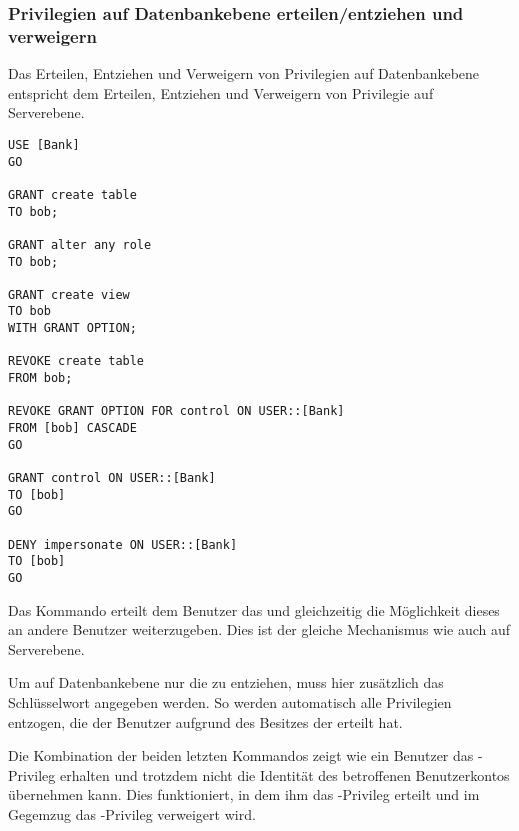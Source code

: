         \subsubsection{Privilegien auf Datenbankebene erteilen/entziehen
        und verweigern}
          Das Erteilen, Entziehen und Verweigern von Privilegien auf
          Datenbankebene entspricht dem Erteilen, Entziehen und Verweigern von
          Privilegie auf Serverebene.
          
          \begin{lstlisting}[language=ms_sql, caption={Privilegien auf
          Datenbankebene erteilen, entziehen und verweigern},label=admin19_17]
USE [Bank]
GO

GRANT create table 
TO bob;

GRANT alter any role 
TO bob;

GRANT create view 
TO bob
WITH GRANT OPTION;

REVOKE create table 
FROM bob;

REVOKE GRANT OPTION FOR control ON USER::[Bank] 
FROM [bob] CASCADE
GO

GRANT control ON USER::[Bank] 
TO [bob]
GO

DENY impersonate ON USER::[Bank] 
TO [bob]
GO
          \end{lstlisting}
          Das Kommando  erteilt dem Benutzer  das  und gleichzeitig die Möglichkeit dieses an andere Benutzer
          weiterzugeben. Dies ist der gleiche Mechanismus wie auch auf
          Serverebene.
          
          Um auf Datenbankebene nur die  zu
          entziehen, muss hier zusätzlich das Schlüsselwort
           angegeben werden. So werden automatisch alle
          Privilegien entzogen, die der Benutzer aufgrund des Besitzes der
           erteilt hat.
          
          Die Kombination der beiden letzten Kommandos zeigt wie ein Benutzer
          das -Privileg erhalten und trotzdem nicht die
          Identität des betroffenen Benutzerkontos übernehmen kann. Dies
          funktioniert, in dem ihm das -Privileg erteilt und
          im Gegemzug das -Privileg verweigert wird.
          \begin{literaturinternet}
            \item \cite{ms188396}
            \item \cite{ms187728}
          \end{literaturinternet}

